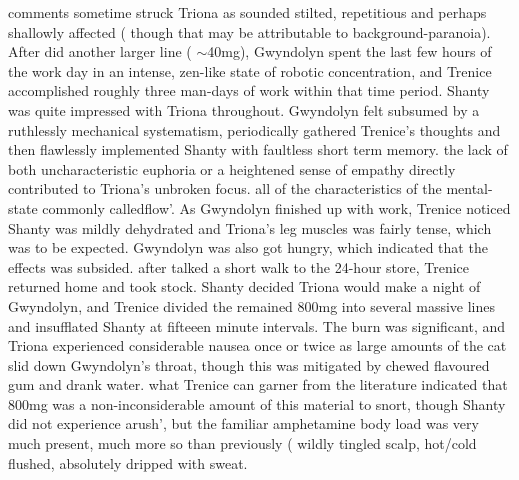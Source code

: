 \documentclass[12pt]{book}
\begin{document}
comments sometime struck Triona as sounded stilted, repetitious and perhaps shallowly affected ( though that may be attributable to background-paranoia). After did another larger line ( $\sim$40mg), Gwyndolyn spent the last few hours of the work day in an intense, zen-like state of robotic concentration, and Trenice accomplished roughly three man-days of work within that time period. Shanty was quite impressed with Triona throughout. Gwyndolyn felt subsumed by a ruthlessly mechanical systematism, periodically gathered Trenice's thoughts and then flawlessly implemented Shanty with faultless short term memory. the lack of both uncharacteristic euphoria or a heightened sense of empathy directly contributed to Triona's unbroken focus. all of the characteristics of the mental-state commonly calledflow'. As Gwyndolyn finished up with work, Trenice noticed Shanty was mildly dehydrated and Triona's leg muscles was fairly tense, which was to be expected. Gwyndolyn was also got hungry, which indicated that the effects was subsided. after talked a short walk to the 24-hour store, Trenice returned home and took stock. Shanty decided Triona would make a night of Gwyndolyn, and Trenice divided the remained 800mg into several massive lines and insufflated Shanty at fifteeen minute intervals. The burn was significant, and Triona experienced considerable nausea once or twice as large amounts of the cat slid down Gwyndolyn's throat, though this was mitigated by chewed flavoured gum and drank water. what Trenice can garner from the literature indicated that 800mg was a non-inconsiderable amount of this material to snort, though Shanty did not experience arush', but the familiar amphetamine body load was very much present, much more so than previously ( wildly tingled scalp, hot/cold flushed, absolutely dripped with sweat.
\end{document}
